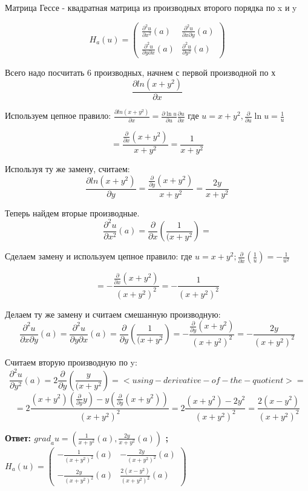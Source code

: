 \documentclass[a4paper,12pt]{article}
\begin{document}
\begin{enumerate}
\begin{enumerate}
Матрица Гессе - квадратная матрица из производных второго порядка по x и y

$$H_a(u) = \begin{pmatrix}
\frac{\partial^2 u}{\partial x^2}(a) & \frac{\partial^2 u}{\partial x \partial y}(a)  \\
\frac{\partial^2 u}{\partial y \partial x}(a) & \frac{\partial^2 u}{\partial y^2}(a) 
\end{pmatrix}$$

Всего надо посчитать 6 производных, начнем с первой производной по х $$\frac{\partial ln(x+y^2)}{\partial x}$$

Используем цепное правило:
$\frac{\partial ln(x+y^2)}{\partial x} = \frac{\partial \ln{u}}{\partial u}\frac{\partial u}{\partial x}$ где $u = x + y^2, \frac{\partial}{\partial u} \ln{u} = \frac{1}{u}$

$$
= \frac{\frac{\partial}{\partial x}(x+y^2)}{x+y^2} = \frac{1}{x+y^2}
$$

Используя ту же замену, считаем: $$\frac{\partial ln(x+y^2)}{\partial y}=\frac{\frac{\partial}{\partial y}(x+y^2)}{x+y^2} = \frac{2y}{x+y^2}$$

Теперь найдем вторые производные.
$$\frac{\partial^2 u}{\partial x^2}(a) = \frac{\partial}{\partial x}(\frac{1}{(x + y^2})=$$

Сделаем замену и используем цепное правило:
где $u = x + y^2; \frac{\partial}{\partial x}(\frac{1}{u})= -\frac{1}{u^2}$

$$=-\frac{ \frac{\partial}{\partial x}(x+y^2)}{(x + y^2)^2} = -\frac{1}{(x + y^2)^2}$$

Делаем ту же замену и считаем смешанную производную:
$$\frac{\partial^2 u}{\partial x\partial y}(a)=\frac{\partial^2 u}{\partial y\partial x}(a) = \frac{\partial}{\partial y}(\frac{1}{(x + y^2})=-\frac{ \frac{\partial}{\partial y}(x+y^2)}{(x + y^2)^2}=-\frac{2y}{(x + y^2)^2}$$

Считаем вторую производную по y:
$$\frac{\partial^2 u}{\partial y^2}(a) =2 \frac{\partial}{\partial y}(\frac{y}{(x + y^2})=<using-derivative-of-the-quotient>=$$ $$=2\frac{(x + y^2)(\frac{\partial}{\partial y}y)-y(\frac{\partial}{\partial y}(x + y^2))}{(x + y^2)^2}=2\frac{(x + y^2)-2y^2}{(x + y^2)^2}=\frac{2(x -y^2)}{(x + y^2)^2}$$


\textbf{Ответ: ${grad}_au = (\frac{1}{x+y^2}(a), \frac{2y}{x+y^2}(a))$ ; $H_a(u) = \begin{pmatrix}
-\frac{1}{(x + y^2)^2}(a) & -\frac{2y}{(x + y^2)^2}(a)  \\
-\frac{2y}{(x + y^2)^2}(a) & \frac{2(x -y^2)}{(x + y^2)^2}(a) 
\end{pmatrix}$}


\end{enumerate}
\end{enumerate}
\end{document}
